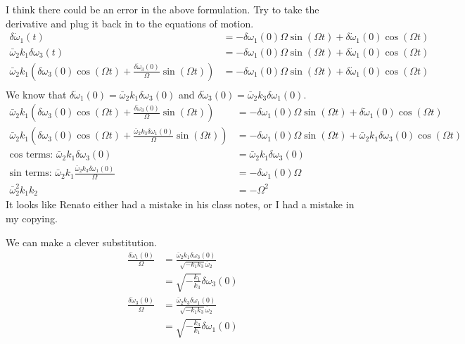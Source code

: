 \documentclass[]{article}
\begin{document}
I think there could be an error in the above formulation. Try to take the derivative and plug it back in to the equations of motion.
\begin{align}
	\delta \dot{\omega}_1(t) & = - \delta \omega_1(0) \Omega \sin(\Omega t) +  \delta \dot{\omega}_1 (0) \cos(\Omega t) \\
	\bar{\omega}_2 k_1 \delta \omega_3 (t) & = - \delta \omega_1(0) \Omega \sin(\Omega t) + \delta \dot{\omega}_1 (0) \cos(\Omega t) \\
	\bar{\omega}_2 k_1 \left( \delta \omega_3(0) \cos(\Omega t) + \frac{\delta \dot{\omega}_3 (0)}{\Omega} \sin(\Omega t) \right) & = - \delta \omega_1(0) \Omega \sin(\Omega t) +  \delta \dot{\omega}_1 (0) \cos(\Omega t) \\
\end{align}
We know that $\delta \dot{\omega}_1(0) = \bar{\omega}_2 k_1 \delta \omega_3(0)$ and $\delta \dot{\omega}_3(0) = \bar{\omega}_2 k_3 \delta \omega_1(0)$.
\begin{align}
	\bar{\omega}_2 k_1 \left( \delta \omega_3(0) \cos(\Omega t) + \frac{\delta \dot{\omega}_3 (0)}{\Omega} \sin(\Omega t) \right) & = - \delta \omega_1(0) \Omega \sin(\Omega t) +  \delta \dot{\omega}_1 (0) \cos(\Omega t) \\
	\bar{\omega}_2 k_1 \left( \delta \omega_3(0) \cos(\Omega t) + \frac{\bar{\omega}_2 k_3 \delta \omega_1(0)}{\Omega} \sin(\Omega t) \right) & = - \delta \omega_1(0) \Omega \sin(\Omega t) +  \bar{\omega}_2 k_1 \delta \omega_3(0) \cos(\Omega t) \\
	\text{cos terms: } \bar{\omega}_2 k_1 \delta \omega_3(0) & = \bar{\omega}_2 k_1 \delta \omega_3(0) \\
	\text{sin terms: } \bar{\omega}_2 k_1 \frac{\bar{\omega}_2 k_3 \delta \omega_1(0)}{\Omega} & = - \delta \omega_1(0) \Omega \\
	\bar{\omega}_2^2 k_1 k_2 & = -\Omega^2
\end{align}
It looks like Renato either had a mistake in his class notes, or I had a mistake in my copying.

We can make a clever substitution.
\begin{align}
	\frac{\delta \dot{\omega}_1 (0)}{\Omega} & = \frac{\bar{\omega}_2 k_1 \delta \omega_3(0)}{\sqrt{-k_1 k_3} \bar{\omega}_2} \\
	& = \sqrt{-\frac{k_1}{k_3}}\delta \omega_3(0) \\
	\frac{\delta \dot{\omega}_3 (0)}{\Omega} & = \frac{\bar{\omega}_2 k_3 \delta \omega_1(0)}{\sqrt{-k_1 k_3} \bar{\omega}_2} \\
	& = \sqrt{-\frac{k_3}{k_1}}\delta \omega_1(0)
\end{align}
\end{document}
